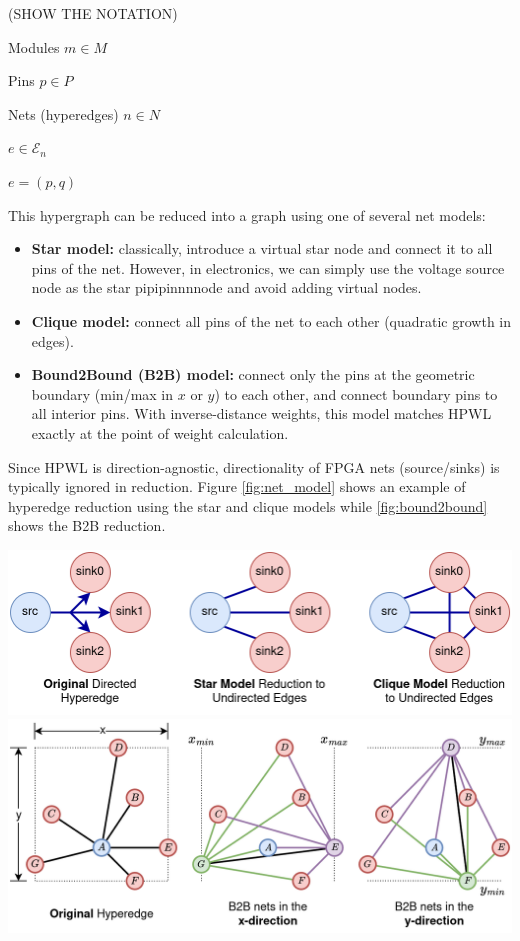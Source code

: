 (SHOW THE NOTATION)

Modules 
$m \in M$

Pins
$p \in P$

Nets (hyperedges)
$n \in N$

$e \in {\mathcal{E}}_n$

$e = (p, q)$





This hypergraph can be reduced into a graph using one of several net models:
\begin{itemize}
    \item \textbf{Star model:} classically, introduce a virtual star node and connect it to all pins of the net. However, in electronics, we can simply use the voltage source node as the star pipipinnnnode and avoid adding virtual nodes.
    \item \textbf{Clique model:} connect all pins of the net to each other (quadratic growth in edges). 
    \item \textbf{Bound2Bound (B2B) model:} connect only the pins at the geometric boundary (min/max in $x$ or $y$) to each other, and connect boundary pins to all interior pins. With inverse-distance weights, this model matches HPWL exactly at the point of weight calculation.
\end{itemize}

Since HPWL is direction-agnostic, directionality of FPGA nets (source/sinks) is typically ignored in reduction. 
Figure \ref{fig:net_model} shows an example of hyperedge reduction using the star and clique models while \ref{fig:bound2bound} shows the B2B reduction.

\vspace{1.0cm}
{
    \centering
    \includegraphics[width=\columnwidth]{figures/future_work/net_model.png}
    \label{fig:net_model}
}
{
    \centering
    \includegraphics[width=\columnwidth]{figures/future_work/bound2bound.png}
    \label{fig:bound2bound}
}

